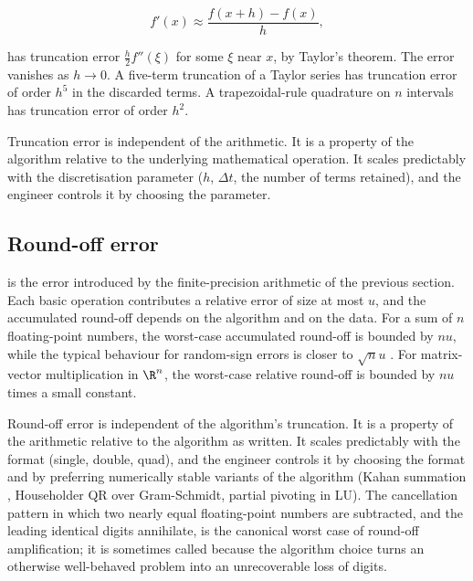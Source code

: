 \[
f'(x) \approx \frac{f(x+h) - f(x)}{h},
\]

has truncation error $\frac{h}{2} f''(\xi)$ for some $\xi$ near
$x$, by Taylor's theorem. The error vanishes as $h \to 0$. A
five-term truncation of a Taylor series has truncation error of
order $h^{5}$ in the discarded terms. A trapezoidal-rule
quadrature on $n$ intervals has truncation error of order $h^{2}$.

Truncation error is independent of the arithmetic. It is a
property of the algorithm relative to the underlying mathematical
operation. It scales predictably with the discretisation parameter
($h$, $\Delta t$, the number of terms retained), and the engineer
controls it by choosing the parameter.

\subsection{Round-off error}

 is the error introduced by the
finite-precision arithmetic of the previous section. Each basic
operation contributes a relative error of size at most $u$, and
the accumulated round-off depends on the algorithm and on the data.
For a sum of $n$ floating-point numbers, the worst-case
accumulated round-off is bounded by $n u$, while the typical
behaviour for random-sign errors is closer to $\sqrt{n} u$
\cite[\S4.2]{text:higham-numerical}. For matrix-vector multiplication
in $\R^{n}$, the worst-case relative round-off is bounded by $n u$
times a small constant.

Round-off error is independent of the algorithm's truncation. It
is a property of the arithmetic relative to the algorithm as
written. It scales predictably with the format (single, double,
quad), and the engineer controls it by choosing the format and by
preferring numerically stable variants of the algorithm (Kahan
summation \cite{text:v2ch16-kahan-1965}, Householder QR over
Gram-Schmidt, partial pivoting in LU). The cancellation pattern in
which two nearly equal floating-point numbers are subtracted, and
the leading identical digits annihilate, is the canonical worst
case of round-off amplification; it is sometimes called
 because the algorithm choice
turns an otherwise well-behaved problem into an unrecoverable
loss of digits.



